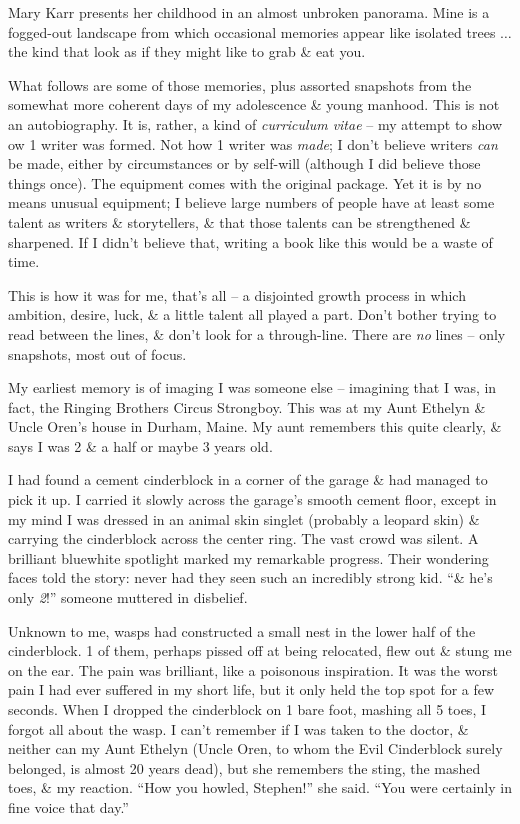 \documentclass{article}
\numberwithin{equation}{section}
\begin{document}
Mary Karr presents her childhood in an almost unbroken panorama. Mine is a fogged-out landscape from which occasional memories appear like isolated trees $\ldots$ the kind that look as if they might like to grab \& eat you.

What follows are some of those memories, plus assorted snapshots from the somewhat more coherent days of my adolescence \& young manhood. This is not an autobiography. It is, rather, a kind of \textit{curriculum vitae} -- my attempt to show ow 1 writer was formed. Not how 1 writer was \textit{made}; I don't believe writers \textit{can} be made, either by circumstances or by self-will (although I did believe those things once). The equipment comes with the original package. Yet it is by no means unusual equipment; I believe large numbers of people have at least some talent as writers \& storytellers, \& that those talents can be strengthened \& sharpened. If I didn't believe that, writing a book like this would be a waste of time.

This is how it was for me, that's all -- a disjointed growth process in which ambition, desire, luck, \& a little talent all played a part. Don't bother trying to read between the lines, \& don't look for a through-line. There are \textit{no} lines -- only snapshots, most out of focus.

 My earliest memory is of imaging I was someone else -- imagining that I was, in fact, the Ringing Brothers Circus Strongboy. This was at my Aunt Ethelyn \& Uncle Oren's house in Durham, Maine. My aunt remembers this quite clearly, \& says I was 2 \& a half or maybe 3 years old.

I had found a cement cinderblock in a corner of the garage \& had managed to pick it up. I carried it slowly across the garage's smooth cement floor, except in my mind I was dressed in an animal skin singlet (probably a leopard skin) \& carrying the cinderblock across the center ring. The vast crowd was silent. A brilliant bluewhite spotlight marked my remarkable progress. Their wondering faces told the story: never had they seen such an incredibly strong kid. ``\& he's only \textit{2}!'' someone muttered in disbelief.

Unknown to me, wasps had constructed a small nest in the lower half of the cinderblock. 1 of them, perhaps pissed off at being relocated, flew out \& stung me on the ear. The pain was brilliant, like a poisonous inspiration. It was the worst pain I had ever suffered in my short life, but it only held the top spot for a few seconds. When I dropped the cinderblock on 1 bare foot, mashing all 5 toes, I forgot all about the wasp. I can't remember if I was taken to the doctor, \& neither can my Aunt Ethelyn (Uncle Oren, to whom the Evil Cinderblock surely belonged, is almost 20 years dead), but she remembers the sting, the mashed toes, \& my reaction. ``How you howled, Stephen!'' she said. ``You were certainly in fine voice that day.''
\end{document}
